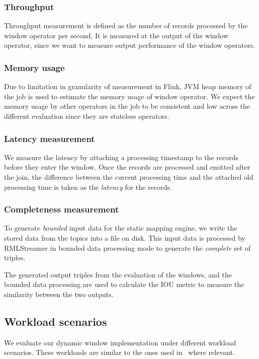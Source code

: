 \subsubsection{Throughput}%
\label{ssub:Throughput}
Throughput measurement is defined as the number of records processed by the 
window operator per second. 
It is measured at the output of the window operator, since we want to measure 
output performance of the window operators. 


\subsubsection{Memory usage}%
\label{ssub:Memory usage}
Due to limitation in granularity of measurement in Flink, 
JVM heap memory of the job is used to estimate the memory usage of window 
operator. We expect the memory usage by other operators in the job to be 
consistent and low across the different evaluation since they are stateless operators.

\subsubsection{Latency measurement}%
\label{ssub:Latency measurement}
We measure the latency by attaching a processing timestamp to the 
records before they enter the window. 
Once the records are processed and emitted after the join, the difference 
between the current processing time and the attached old processing time 
is taken as the \emph{latency} for the records. 

\subsubsection{Completeness measurement}%
\label{ssub:Completeness measurement}
To generate \emph{bounded} input data for 
the static mapping engine, we write the stored data from the topics 
into a file on disk. This input data is processed by RMLStreamer in bounded data 
processing mode to generate the \emph{complete} set of triples. 

The generated output triples from the evaluation of the windows, and the bounded data processing are 
used to calculate the IOU metric to measure the similarity between the two outputs.    



\subsection{Workload scenarios}
\label{sec:workload}
We evaluate our dynamic window implementation under different workload scenarios. 
These workloads are similar to the ones used in~\cite{evalution_of_spe} where relevant.

